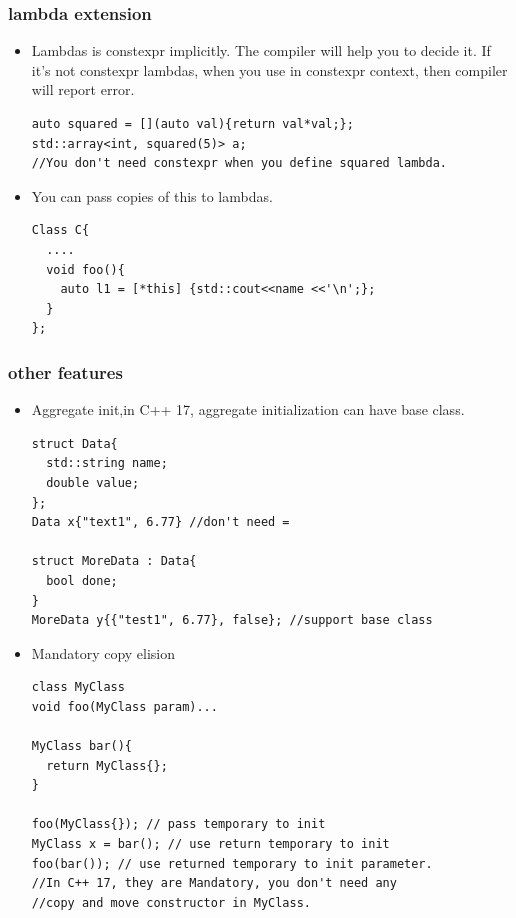 \documentclass[a4paper,11pt,twoside]{book}
\begin{document}
\subsubsection{lambda extension}
\begin{itemize}
    \item Lambdas is constexpr implicitly. The compiler will help you to decide it. If it's not constexpr lambdas, when you use in constexpr context, then compiler will report error. 
\begin{lstlisting}
auto squared = [](auto val){return val*val;};
std::array<int, squared(5)> a;
//You don't need constexpr when you define squared lambda.
\end{lstlisting}

    \item You can pass copies of this to lambdas.
\begin{lstlisting}
Class C{
  ....
  void foo(){
    auto l1 = [*this] {std::cout<<name <<'\n';};
  }
};
\end{lstlisting}
\end{itemize}

\subsubsection{other features}
\begin{itemize}

    \item Aggregate init,in C++ 17, aggregate initialization can have base class.
\begin{lstlisting}
struct Data{
  std::string name;
  double value;
};
Data x{"text1", 6.77} //don't need =

struct MoreData : Data{
  bool done;
}
MoreData y{{"test1", 6.77}, false}; //support base class
\end{lstlisting}

    \item Mandatory copy elision
\begin{lstlisting}
class MyClass
void foo(MyClass param)...

MyClass bar(){
  return MyClass{};
}

foo(MyClass{}); // pass temporary to init
MyClass x = bar(); // use return temporary to init
foo(bar()); // use returned temporary to init parameter.
//In C++ 17, they are Mandatory, you don't need any 
//copy and move constructor in MyClass.
\end{lstlisting}

\end{itemize}
\end{document}
